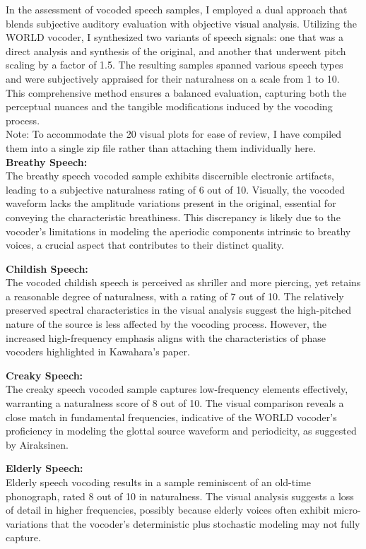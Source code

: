 \documentclass{../labbook}
\begin{document}
\begin{solution}

    In the assessment of vocoded speech samples, I employed a dual approach that blends subjective auditory evaluation with objective visual analysis. Utilizing the WORLD vocoder, I synthesized two variants of speech signals: one that was a direct analysis and synthesis of the original, and another that underwent pitch scaling by a factor of 1.5. The resulting samples spanned various speech types and were subjectively appraised for their naturalness on a scale from 1 to 10. This comprehensive method ensures a balanced evaluation, capturing both the perceptual nuances and the tangible modifications induced by the vocoding process.\\
    Note: To accommodate the 20 visual plots for ease of review, I have compiled them into a single zip file rather than attaching them individually here.\\
    \textbf{Breathy Speech:}\\
    The breathy speech vocoded sample exhibits discernible electronic artifacts, leading to a subjective naturalness rating of 6 out of 10. Visually, the vocoded waveform lacks the amplitude variations present in the original, essential for conveying the characteristic breathiness. This discrepancy is likely due to the vocoder's limitations in modeling the aperiodic components intrinsic to breathy voices, a crucial aspect that contributes to their distinct quality.
    
    \textbf{Childish Speech:}\\
    The vocoded childish speech is perceived as shriller and more piercing, yet retains a reasonable degree of naturalness, with a rating of 7 out of 10. The relatively preserved spectral characteristics in the visual analysis suggest the high-pitched nature of the source is less affected by the vocoding process. However, the increased high-frequency emphasis aligns with the characteristics of phase vocoders highlighted in Kawahara’s paper.
    
    \textbf{Creaky Speech:}\\
    The creaky speech vocoded sample captures low-frequency elements effectively, warranting a naturalness score of 8 out of 10. The visual comparison reveals a close match in fundamental frequencies, indicative of the WORLD vocoder's proficiency in modeling the glottal source waveform and periodicity, as suggested by Airaksinen.
    
    \textbf{Elderly Speech:}\\
    Elderly speech vocoding results in a sample reminiscent of an old-time phonograph, rated 8 out of 10 in naturalness. The visual analysis suggests a loss of detail in higher frequencies, possibly because elderly voices often exhibit micro-variations that the vocoder's deterministic plus stochastic modeling may not fully capture.
    

\end{solution}
\end{document}
